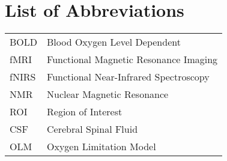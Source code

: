 \chapter*{List of Abbreviations}
\begin{table*}[h]
    \begin{tabular*}{\linewidth}{l l}
      BOLD   & Blood Oxygen Level Dependent           \\
      fMRI   & Functional Magnetic Resonance Imaging  \\
      fNIRS  & Functional Near-Infrared Spectroscopy  \\
      NMR    & Nuclear Magnetic Resonance             \\
      ROI    & Region of Interest                     \\
      CSF    & Cerebral Spinal Fluid                  \\
      OLM    & Oxygen Limitation Model                \\
    \end{tabular*}
\end{table*}